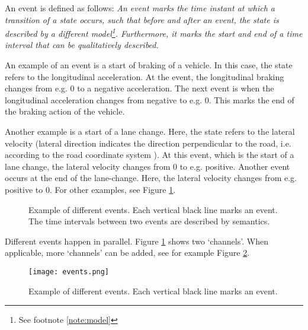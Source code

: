 An event is defined as follows: \emph{An event marks the time instant at which a transition of a state occurs, such that before and after an event, the state is described by a different model\footnote{See footnote \ref{note:model}}. Furthermore, it marks the start and end of a time interval that can be qualitatively described.}

An example of an event is a start of braking of a vehicle. In this case, the state refers to the longitudinal acceleration. At the event, the longitudinal braking changes from e.g. 0 to a negative acceleration. The next event is when the longitudinal acceleration changes from negative to e.g. 0. This marks the end of the braking action of the vehicle.

Another example is a start of a lane change. Here, the state refers to the lateral velocity (lateral direction indicates the direction perpendicular to the road, i.e. according to the road coordinate system \cite{zofka2015datadrivetrafficscenarios}). At this event, which is the start of a lane change, the lateral velocity changes from 0 to e.g. positive. Another event occurs at the end of the lane-change. Here, the lateral velocity changes from e.g. positive to 0. For other examples, see Figure \ref{fig:lon and lat events}.

\begin{figure}[b]
	\begin{center}
		\caption{Example of different events. Each vertical black line marks an event. The time intervals between two events are described by semantics.}
		\label{fig:lon and lat events}
	\end{center}
\end{figure}

Different events happen in parallel. Figure \ref{fig:lon and lat events} shows two `channels'. When applicable, more `channels' can be added, see for example Figure \ref{fig:events}. 

\begin{figure}
	\begin{center}
		\texttt{[image: events.png]}
		\caption{Example of different events. Each vertical black line marks an event.}
		\label{fig:events}
	\end{center}
\end{figure}
